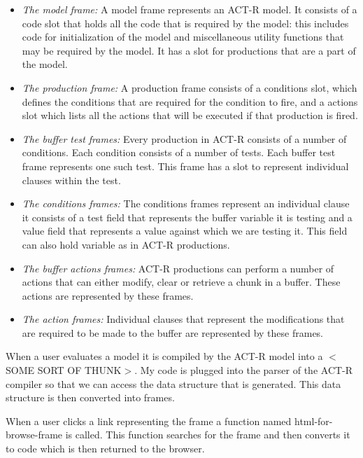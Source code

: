 
\begin{itemize}
\item \emph{The model frame:} A model frame represents an ACT-R
  model. It consists of a code slot that holds all the code that is
  required by the model: this includes code for initialization of the
  model and miscellaneous utility functions that may be required by
  the model. It has a slot for productions that are a part of the
  model.
\item \emph{The production frame:} A production frame consists of a
  conditions slot, which defines the conditions that are required for
  the condition to fire, and a actions slot which lists all the
  actions that will be executed if that production is fired.
\item \emph{The buffer test frames:} Every production in ACT-R consists
  of a number of conditions. Each condition consists of a number of
  tests. Each buffer test frame represents one such test. This frame
  has a slot to represent individual clauses within the test.
\item \emph{The conditions frames:} The conditions frames represent an
  individual clause it consists of a test field that represents the
  buffer variable it is testing and a value field that represents a
  value against which we are testing it. This field can also hold
  variable as in ACT-R productions.
\item \emph{The buffer actions frames:} ACT-R productions can perform
  a number of actions that can either modify, clear or retrieve a
  chunk in a buffer. These actions are represented by these frames.
\item \emph{The action frames:} Individual clauses that represent the
  modifications that are required to be made to the buffer are
  represented by these frames.
\end{itemize}

When a user evaluates a model it is compiled by the ACT-R model into a
$<$SOME SORT OF THUNK$>$. My code is plugged into the parser of the
ACT-R compiler so that we can access the data structure that is
generated. This data structure is then converted into frames. 

When a user clicks a link representing the frame a function named
html-for-browse-frame is called. This function searches for the frame
and then converts it to code which is then returned to the browser.

